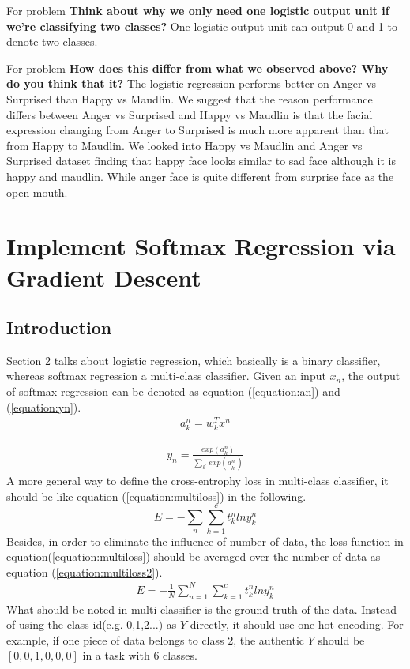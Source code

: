 \documentclass{article}
\begin{document}
For problem \textbf{Think about why we only need one logistic output unit if we’re classifying two classes?} One logistic output unit can output 0 and 1 to denote two classes.

For problem \textbf{How does this differ from what we observed above? Why do you think that it?} The logistic regression performs better on Anger vs Surprised than Happy vs Maudlin. We suggest that the reason performance differs between Anger vs Surprised and Happy vs Maudlin is that the facial expression changing from Anger to Surprised is much more apparent than that from Happy to Maudlin. We looked into Happy vs Maudlin and Anger vs Surprised dataset finding that happy face looks similar to sad face although it is happy and maudlin. While anger face is quite different from surprise face as the open mouth.

\section{Implement Softmax Regression via Gradient Descent}

\subsection{Introduction}
Section 2 talks about logistic regression, which basically is a binary classifier, whereas softmax regression a multi-class classifier. Given an input $x_n$, the output of softmax regression can be denoted as equation (\ref{equation:an}) and (\ref{equation:yn}).
\begin{equation}
\begin{split}
a_k^n = w_k^T x^n
\end{split}
\label{equation:an}
\end{equation}

\begin{equation}
\begin{split}
    y_n = \frac{exp(a_k^n)}{\sum_{k^{'}}{exp(a_{k^{'}}^n)}}
\end{split}
\label{equation:yn}
\end{equation}
A more general way to define the cross-entrophy loss in multi-class classifier, it should be like equation (\ref{equation:multiloss}) in the following.
\begin{equation}
E = -\sum_n\sum_{k=1}^{c}t_k^n ln{y_k^n}
\label{equation:multiloss}
\end{equation}
Besides, in order to eliminate the influence of number of data, the loss function in equation(\ref{equation:multiloss}) should be averaged over the number of data as equation (\ref{equation:multiloss2}).
\begin{equation}
    \begin{split}
    E = -\frac{1}{N}\sum_{n=1}^N\sum_{k=1}^{c}t_k^n ln{y_k^n}
    \end{split}
    \label{equation:multiloss2}
\end{equation}
What should be noted in multi-classifier is the ground-truth of the data. Instead of using the class id(e.g. 0,1,2...) as $Y$ directly, it should use one-hot encoding. For example, if one piece of data belongs to class 2, the authentic $Y$ should be $[0,0,1,0,0,0]$ in a task with 6 classes.
\end{document}
